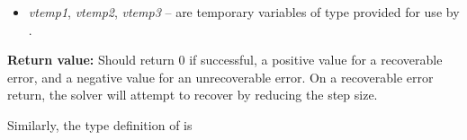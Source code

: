 \documentclass[letterpaper,10pt,english]{sphinxmanual}
\begin{document}
\begin{fulllineitems}
\begin{description}
\begin{itemize}
\item {} 
\emph{vtemp1}, \emph{vtemp2}, \emph{vtemp3} -- are temporary variables of
type  provided for use by {\hyperref[linear_solvers/custom:lsetup]{}}.

\end{itemize}

\end{description}

\textbf{Return value:}
Should return 0 if successful, a positive value
for a recoverable error, and a negative value for an unrecoverable
error.  On a recoverable error return, the solver will attempt to
recover by reducing the step size.

\end{fulllineitems}


Similarly, the type definition of {\hyperref[linear_solvers/custom:msetup]{}} is
\end{document}
